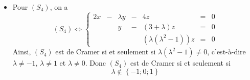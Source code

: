 {{\begin{itemize}[label=\textbullet]
\[\begin{array}{ccccccc}
				x&-&2y&+&(5-\lambda)z &=&0 \\
				  &&(2-\lambda) y & + &(-3+3\lambda) z &=& 0 \\
				  & &  & & (\lambda -\lambda^2 )z &= & 0
			 \end{array}\right.\]
		Ainsi, $(S_3)$ est de Cramer si et seulement si $2-\lambda \neq 0$ et $\lambda-\lambda^2  \neq 0$, c'est-à-dire $\lambda \neq 2$, $\lambda \neq 0$ et $\lambda \neq 1$. Donc $(S_3)$ est de Cramer si et seulement si \[\boxed{\lambda \not \in \left \{0;1;2\right\}}\]
	\item Pour $(S_4)$, on a
		\[(S_4) \Leftrightarrow \left \{ \begin{array}{ccccccc}
				2x&-&\lambda y&-&4z &=&0 \\
				  && y & - &(3+\lambda) z &=& 0 \\
				  & &  & & (\lambda(\lambda^2-1) )z &= & 0
			 \end{array}\right.\]
		Ainsi, $(S_4)$ est de Cramer si et seulement si $\lambda(\lambda^2 -1)  \neq 0$, c'est-à-dire $\lambda \neq -1$, $\lambda \neq 1$ et $\lambda \neq 0$. Donc $(S_4)$ est de Cramer si et seulement si \[\boxed{\lambda \not \in \left \{-1;0;1\right\}}\]
\end{itemize}}
}
